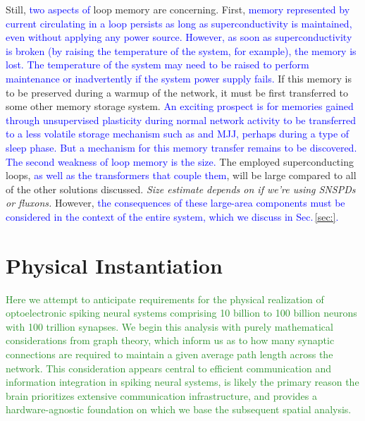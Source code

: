 \documentclass[twocolumn]{article}
\begin{document}
Still, \textcolor{blue}{two aspects of} loop memory are concerning. First, \textcolor{blue}{memory represented by current circulating in a loop persists as long as superconductivity is maintained, even without applying any power source. However, as soon as superconductivity is broken (by raising the temperature of the system, for example), the memory is lost. The temperature of the system may need to be raised to perform maintenance or inadvertently if the system power supply fails.} If this memory is to be preserved during a warmup of the network, it must be first transferred to some other memory storage system. \textcolor{blue}{An exciting prospect is for memories gained through unsupervised plasticity during normal network activity to be transferred to a less volatile storage mechanism such as and MJJ, perhaps during a type of sleep phase. But a mechanism for this memory transfer remains to be discovered. The second weakness of loop memory is the size.} The employed superconducting loops, \textcolor{blue}{as well as the transformers that couple them}, will be large compared to all of the other solutions discussed. \textit{Size estimate depends on if we're using SNSPDs or fluxons.} However, \textcolor{blue}{the consequences of these large-area components must be considered in the context of the entire system, which we discuss in Sec.\,\ref{sec:}.} 


\section{\label{sec:instantiation}Physical Instantiation}
\textcolor{ForestGreen}{Here we attempt to anticipate requirements for the physical realization of optoelectronic spiking neural systems comprising 10 billion to 100 billion neurons with 100 trillion synapses. We begin this analysis with purely mathematical considerations from graph theory, which inform us as to how many synaptic connections are required to maintain a given average path length across the network. This consideration appears central to efficient communication and information integration in spiking neural systems, is likely the primary reason the brain prioritizes extensive communication infrastructure, and provides a hardware-agnostic foundation on which we base the subsequent spatial analysis.}
\end{document}
